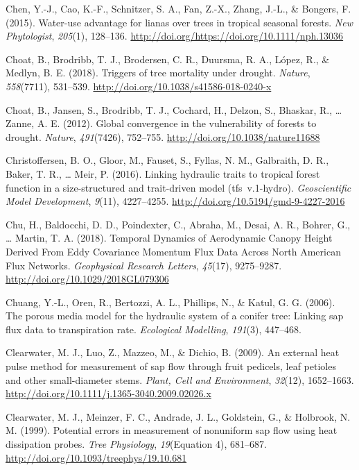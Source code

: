 \documentclass[11pt,twoside]{reedthesis}
\begin{document}
\hypertarget{ref-Chen2015}{}
Chen, Y.-J., Cao, K.-F., Schnitzer, S. A., Fan, Z.-X., Zhang, J.-L., \&
Bongers, F. (2015). Water-use advantage for lianas over trees in
tropical seasonal forests. \emph{New Phytologist}, \emph{205}(1),
128--136. \url{http://doi.org/https://doi.org/10.1111/nph.13036}

\hypertarget{ref-choat_triggers_2018}{}
Choat, B., Brodribb, T. J., Brodersen, C. R., Duursma, R. A., López, R.,
\& Medlyn, B. E. (2018). Triggers of tree mortality under drought.
\emph{Nature}, \emph{558}(7711), 531--539.
\url{http://doi.org/10.1038/s41586-018-0240-x}

\hypertarget{ref-choat_global_2012}{}
Choat, B., Jansen, S., Brodribb, T. J., Cochard, H., Delzon, S.,
Bhaskar, R., \ldots{} Zanne, A. E. (2012). Global convergence in the
vulnerability of forests to drought. \emph{Nature}, \emph{491}(7426),
752--755. \url{http://doi.org/10.1038/nature11688}

\hypertarget{ref-Christoffersen2016}{}
Christoffersen, B. O., Gloor, M., Fauset, S., Fyllas, N. M., Galbraith,
D. R., Baker, T. R., \ldots{} Meir, P. (2016). Linking hydraulic traits
to tropical forest function in a size-structured and trait-driven model
(tfs~v.1-hydro). \emph{Geoscientific Model Development}, \emph{9}(11),
4227--4255. \url{http://doi.org/10.5194/gmd-9-4227-2016}

\hypertarget{ref-chu_temporal_2018}{}
Chu, H., Baldocchi, D. D., Poindexter, C., Abraha, M., Desai, A. R.,
Bohrer, G., \ldots{} Martin, T. A. (2018). Temporal Dynamics of
Aerodynamic Canopy Height Derived From Eddy Covariance Momentum Flux
Data Across North American Flux Networks. \emph{Geophysical Research
Letters}, \emph{45}(17), 9275--9287.
\url{http://doi.org/10.1029/2018GL079306}

\hypertarget{ref-Chuang2006}{}
Chuang, Y.-L., Oren, R., Bertozzi, A. L., Phillips, N., \& Katul, G. G.
(2006). The porous media model for the hydraulic system of a conifer
tree: Linking sap flux data to transpiration rate. \emph{Ecological
Modelling}, \emph{191}(3), 447--468.

\hypertarget{ref-Clearwater2009}{}
Clearwater, M. J., Luo, Z., Mazzeo, M., \& Dichio, B. (2009). An
external heat pulse method for measurement of sap flow through fruit
pedicels, leaf petioles and other small-diameter stems. \emph{Plant,
Cell and Environment}, \emph{32}(12), 1652--1663.
\url{http://doi.org/10.1111/j.1365-3040.2009.02026.x}

\hypertarget{ref-Clearwater1999}{}
Clearwater, M. J., Meinzer, F. C., Andrade, J. L., Goldstein, G., \&
Holbrook, N. M. (1999). Potential errors in measurement of nonuniform
sap flow using heat dissipation probes. \emph{Tree Physiology},
\emph{19}(Equation 4), 681--687.
\url{http://doi.org/10.1093/treephys/19.10.681}
\end{document}
